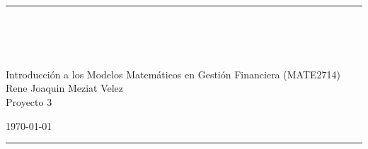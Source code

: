 \fancyhead[C]{}
\hrule \medskip
\begin{minipage}{0.295\textwidth} 
\raggedright
\footnotesize
\firstname \hfill\\ 
\firstid \hfill\\ 
\firstemail \hfill\\
\end{minipage}
\begin{minipage}{0.4\textwidth} 
\centering 
\large 
Introducción a los Modelos Matemáticos en Gestión Financiera (MATE2714)\\ 
\normalsize
Rene Joaquin Meziat Velez\\
Proyecto 3\\ 
\end{minipage}
\begin{minipage}{0.295\textwidth} 
\raggedleft
\today\hfill\\
\end{minipage}
\medskip\hrule 
\bigskip